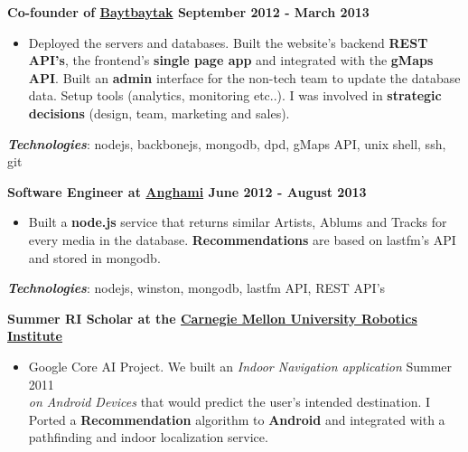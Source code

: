 \documentclass[10pt]{article}
\newenvironment{outerlist}[1][\enskip\textbullet]%
        {\begin{itemize}[#1]}{\end{itemize}%
         \vspace{-.6\baselineskip}}
\begin{document}
\vspace{0.4cm}


\textbf{Co-founder of \href{http://baytbaytak.com}{Baytbaytak} \hfill \small September 2012 - March 2013} 
\begin{outerlist}
\item[] Deployed the servers and databases.
Built the website's backend \textbf{REST API's}, the frontend's \textbf{single page app} and integrated with the \textbf{gMaps API}. 
Built an \textbf{admin} interface for the non-tech team to update the database data. Setup tools (analytics, monitoring etc..).
I was involved in \textbf{strategic decisions} (design, team, marketing and sales).
\end{outerlist}

\vspace{0.2cm}
\hspace{0.25cm}\textbf{\textit{Technologies}}: 
nodejs, backbonejs, mongodb, dpd, gMaps API, unix shell, ssh, git

\vspace{0.4cm}

\textbf{
  Software Engineer at \href{http://anghami.com/}{Anghami} 
  \hfill \small June 2012 - August 2013
}
\begin{outerlist}
\item[] Built a \textbf{node.js} service that returns similar Artists, 
Ablums and Tracks for every media in the database.
\textbf{Recommendations} are based on lastfm's API and stored in mongodb.
\end{outerlist}

\vspace{0.2cm}
\hspace{0.25cm}\textbf{\textit{Technologies}}: 
nodejs, winston, mongodb, lastfm API, REST API's

\vspace{0.4cm}

\textbf{Summer RI Scholar at the \href{http://www.ri.cmu.edu/}{Carnegie Mellon University Robotics Institute}}
\begin{outerlist}
\item[] Google Core AI Project. We built an \textit{Indoor Navigation application}
\hfill \small Summer 2011 \\
\textit{on Android Devices} that would predict the user's intended destination.
I Ported a \textbf{Recommendation}
algorithm to \textbf{Android} and integrated with a pathfinding and indoor localization service.
\end{outerlist}
\end{document}
